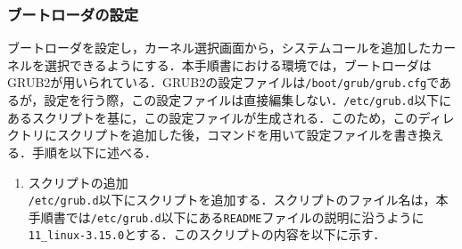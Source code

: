 \documentclass[12pt]{jsarticle}
\begin{document}
\subsubsection{ブートローダの設定}\label{boot}
ブートローダを設定し，カーネル選択画面から，システムコールを追加したカーネルを選択できるようにする．本手順書における環境では，ブートローダはGRUB2が用いられている．GRUB2の設定ファイルは\verb|/boot/grub/grub.cfg|であるが，設定を行う際，この設定ファイルは直接編集しない．\verb|/etc/grub.d|以下にあるスクリプトを基に，この設定ファイルが生成される．このため，このディレクトリにスクリプトを追加した後，コマンドを用いて設定ファイルを書き換える．手順を以下に述べる．
\begin{enumerate}
\item スクリプトの追加\\
\verb|/etc/grub.d|以下にスクリプトを追加する．スクリプトのファイル名は，本手順書では\verb|/etc/grub.d|以下にある\verb|README|ファイルの説明に沿うように\verb|11_linux-3.15.0|とする．このスクリプトの内容を以下に示す．
    

\end{enumerate}
\end{document}
